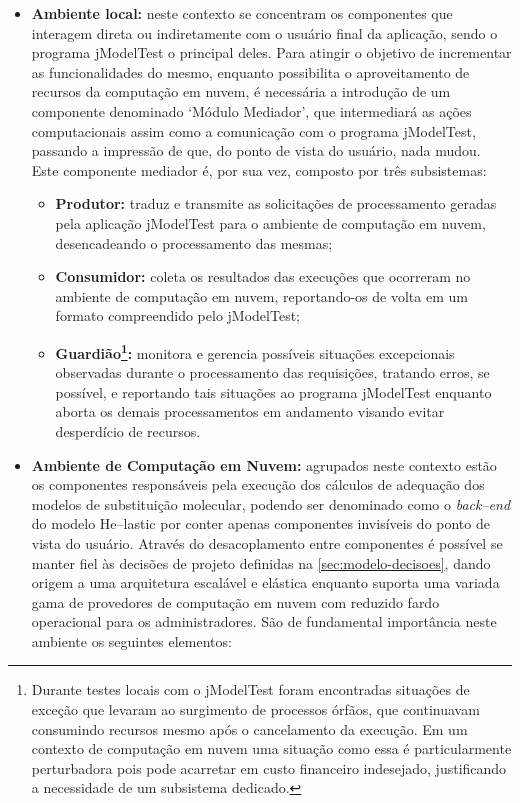 \documentclass[english,brazilian]{UNISINOSmonografia} %
\begin{document}
\begin{itemize}
	
	\item \textbf{Ambiente local:} 
	neste contexto se concentram os componentes que interagem direta ou indiretamente com o usuário final da aplicação, sendo o programa jModelTest o principal deles.
	Para atingir o objetivo de incrementar as funcionalidades do mesmo, enquanto possibilita o aproveitamento de recursos da computação em nuvem, é necessária a introdução de um componente denominado \textquoteleft Módulo Mediador\textquoteright, que intermediará as ações computacionais assim como a comunicação com o programa jModelTest, passando a impressão de que, do ponto de vista do usuário, nada mudou.
	Este componente mediador é, por sua vez, composto por três subsistemas: 
	\begin{itemize}
		
		\item \textbf{Produtor:} traduz e transmite as solicitações de processamento geradas pela aplicação jModelTest para o ambiente de computação em nuvem, desencadeando o processamento das mesmas;
		
		\item \textbf{Consumidor:} coleta os resultados das execuções que ocorreram no ambiente de computação em nuvem, reportando-os de volta em um formato compreendido pelo jModelTest;
		
		\item \textbf{Guardião\footnote{
	Durante testes locais com o jModelTest foram encontradas situações de exceção que levaram ao surgimento de processos órfãos, que continuavam consumindo recursos mesmo após o cancelamento da execução. Em um contexto de computação em nuvem uma situação como essa é particularmente perturbadora pois pode acarretar em custo financeiro indesejado, justificando a necessidade de um subsistema dedicado.
}:}
		monitora e gerencia possíveis situações excepcionais observadas durante o processamento das requisições, tratando erros, se possível, e reportando tais situações ao programa jModelTest enquanto aborta os demais processamentos em andamento visando evitar desperdício de recursos.
		
	\end{itemize}

	
	\item \textbf{Ambiente de Computação em Nuvem:} 
	agrupados neste contexto estão os componentes responsáveis pela execução dos cálculos de adequação dos modelos de substituição molecular, podendo ser denominado como o \textit{back--end} do modelo \textsf{He}--lastic por conter apenas componentes invisíveis do ponto de vista do usuário.
	Através do desacoplamento entre componentes é possível se manter fiel às decisões de projeto definidas na \autoref{sec:modelo-decisoes}, dando origem a uma arquitetura escalável e elástica enquanto suporta uma variada gama de provedores de computação em nuvem com reduzido fardo operacional para os administradores.
	São de fundamental importância neste ambiente os seguintes elementos:
	

\end{itemize}
\end{document}
